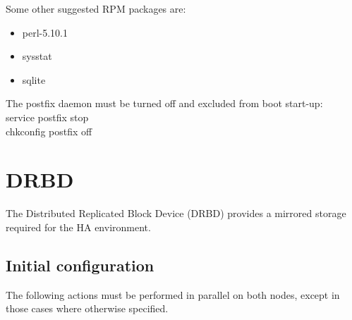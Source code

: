 \documentclass[a4paper, 12pt]{book}
\begin{document}
\noindent Some other suggested RPM packages are:

\begin{itemize}
	\item perl-5.10.1
	\item sysstat 
	\item sqlite 
\end{itemize}

\noindent The postfix daemon must be turned off and excluded from boot start-up:\\
\indent service postfix stop\\
\indent chkconfig postfix off


\section{DRBD}
\label{sec:drbd}

\noindent The Distributed Replicated Block Device (DRBD) provides a mirrored storage required for the HA environment.


\subsection{Initial configuration}
\label{sec:initialconf}

The following actions must be performed in parallel on both nodes, except in those cases where otherwise specified.
\end{document}
